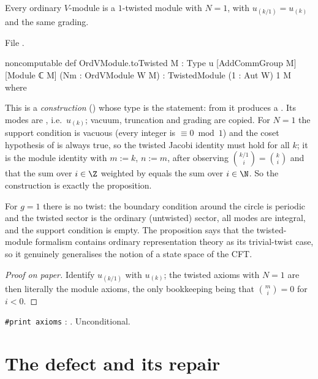 \begin{proposition}\label{ch06:prop:totwisted}
Every ordinary $V$-module is a $1$-twisted module with $N=1$, with $u_{(k/1)}=u_{(k)}$ and the same
grading.
\end{proposition}
\noindent File .
\begin{leancode}
noncomputable def OrdVModule.toTwisted {M : Type u} [AddCommGroup M] [Module ℂ M]
    (Nm : OrdVModule W M) : TwistedModule (1 : Aut W) 1 M where
\end{leancode}
\begin{dictionary}
This is a \emph{construction} () whose type is the statement: from  it produces
a .  Its modes are , i.e.\
$u_{(k)}$; vacuum, truncation and grading are copied.  For $N=1$ the support condition is vacuous
(every integer is $\equiv 0 \bmod 1$) and the coset hypothesis of \lean{jacobi} is always true, so
the twisted Jacobi identity must hold for all $k$; it is the module identity with $m:=k$,
$n:=m$, after observing $\binom{k/1}{i}=\binom ki$ and that the sum over $i\in\Z$ weighted by
\lean{cbz} equals the sum over $i\in\N$.  So the construction is exactly the proposition.
\end{dictionary}

\begin{physics}
For $g=1$ there is no twist: the boundary condition around the circle is periodic and the twisted sector is the ordinary (untwisted) sector, all modes are integral, and the support condition is empty. The proposition says that the twisted-module formalism contains ordinary representation theory as its trivial-twist case, so it genuinely generalises the notion of a state space of the CFT.
\end{physics}
\begin{proof}[Proof on paper]
Identify $u_{(k/1)}$ with $u_{(k)}$; the twisted axioms with $N=1$ are then literally the module
axioms, the only bookkeeping being that $\binom{m}{i}=0$ for $i<0$.
\end{proof}
\begin{status}
\texttt{\#print axioms} : .
Unconditional.
\end{status}

\section{The defect and its repair}\label{ch06:sec:repair}

